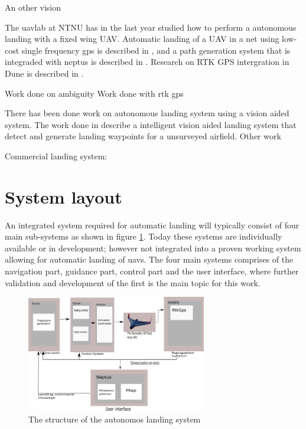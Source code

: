 An other vision \citep{kim2013fully}

The uavlab at NTNU has in the last year studied how to perform a autonomous landing with a fixed wing UAV. Automatic landing of a UAV in a net using low-cost single frequency gps is described in \citep{Skulstad&Syversen}, and a path generation system that is integraded with neptus is described in \citep{Froelich}. Research on RTK GPS intergration in Dune is described in \citep{Spockeli}.

Work done on ambiguity
\cite{Ambiguity:Estimation,LAMBDA:METHOD,LAMBDAMETHOD,GeodeticBaselines} 
Work done with rtk gps
\citep{Low-costRTK}  \citep{3D-RTK}

There has been done work on autonomous landing system using a vision aided system. The work done in \citep{williams2012intelligent} describe a intelligent vision aided landing system that detect and generate landing waypoints for a unsurveyed airfield. Other work 

Commercial landing system:  \citep{scanealge}

\section{System layout}
An integrated system required for automatic landing will typically consist of four main sub-systems as shown in figure \ref{figure:SystemOverview}. Today these systems are individually available or in development; however not integrated into a proven working system allowing for automatic landing of \glspl{uav}. The four main systems comprises of the navigation part, guidance part, control part and the user interface, where further validation and development of the first is the main topic for this work.

\begin{figure}[H]
	\centering
		\includegraphics[width=0.7\textwidth]{figs/SystemOverview.png}
		\caption{The structure of the autonomos landing system}
		\label{figure:SystemOverview}
\end{figure}

